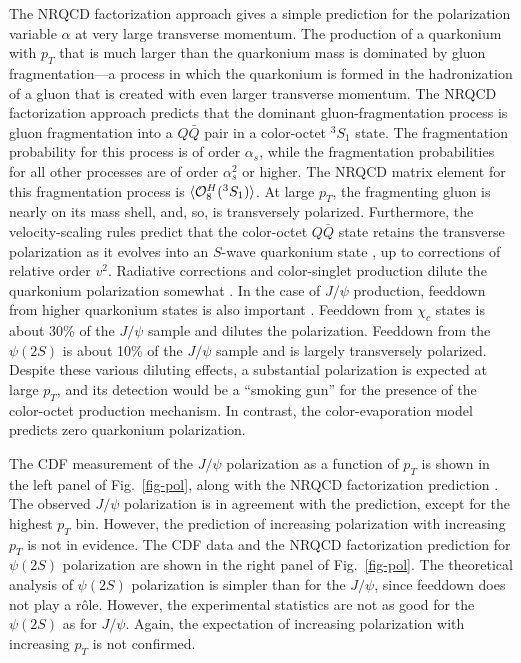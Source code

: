 The NRQCD factorization approach gives a simple prediction for the 
polarization variable $\alpha$ at very large transverse momentum.
The production of a quarkonium with $p_T$ that
is much larger than the quarkonium mass is dominated by gluon
fragmentation---a process in which the quarkonium is formed in the
hadronization of a gluon that is created with even larger transverse
momentum. The NRQCD factorization approach predicts that the dominant
gluon-fragmentation process is gluon fragmentation into a $Q\bar Q$ pair
in a color-octet ${}^3S_1$ state.  The fragmentation probability for
this process is of order $\alpha_s$, while the fragmentation
probabilities for all other processes are of order $\alpha_s^2$ or
higher. The NRQCD matrix element for this fragmentation process is
$\langle{\cal O}^H_8({}^3S_1)\rangle$. At large $p_T$, the fragmenting
gluon is nearly on its mass shell, and, so, is transversely polarized.
Furthermore, the velocity-scaling rules predict that the color-octet
$Q\bar Q$ state retains the transverse polarization as it evolves into
an $S$-wave quarkonium state \cite{Cho:1994ih}, up to corrections of
relative order $v^2$. Radiative corrections and color-singlet production
dilute the quarkonium polarization somewhat
\cite{Beneke:1995yb,Beneke:1996yw}. In the case of $J/\psi$ production,
feeddown from higher quarkonium states is also important
\cite{Braaten:1999qk}. Feeddown from $\chi_c$ states is about 30\% of
the $J/\psi$ sample and dilutes the polarization. Feeddown from the
$\psi(2S)$ is about 10\% of the $J/\psi$ sample and is largely
transversely polarized. Despite these various diluting effects, a
substantial polarization is expected at large $p_T$, and its detection
would be a ``smoking gun'' for the presence of the color-octet production
mechanism. In contrast, the color-evaporation model predicts zero
quarkonium polarization.

The CDF measurement of the $J/\psi$ polarization as a function of
$p_T$ \cite{Affolder:2000nn} is shown in the left panel of
Fig.~\ref{fig-pol}, along with the NRQCD factorization prediction
\cite{Braaten:1999qk}.  The observed $J/\psi$ polarization is in
agreement with the prediction, except for the highest $p_T$
bin. However, the prediction of increasing polarization with
increasing $p_T$ is not in evidence. The CDF data
\cite{Affolder:2000nn} and the NRQCD factorization prediction 
\cite{Beneke:1996yw,Leibovich:1996pa,Braaten:1999qk} for $\psi(2S)$
polarization are shown in the right panel of Fig.~\ref{fig-pol}.  The
theoretical analysis of $\psi(2S)$ polarization is simpler than for
the $J/\psi$, since feeddown does not play a r\^ole. However, the
experimental statistics are not as good for the $\psi(2S)$ as for
$J/\psi$. Again, the expectation of increasing polarization with
increasing $p_T$ is not confirmed.

